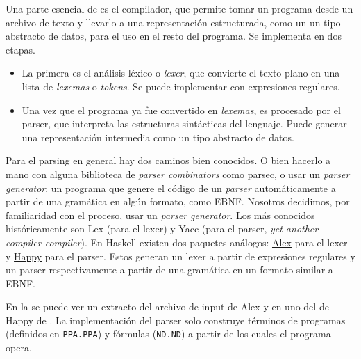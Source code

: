 Una parte esencial de \ppaTool{} es el compilador, que permite tomar un programa
desde un archivo de texto y llevarlo a una representación estructurada, como un
un tipo abstracto de datos, para el uso en el resto del programa. Se implementa
en dos etapas.

\begin{itemize}
    \item La primera es el análisis léxico o \textit{lexer}, que convierte el
    texto plano en una lista de \textit{lexemas} o \textit{tokens}. Se puede
    implementar con expresiones regulares.
    \item Una vez que el programa ya fue convertido en \textit{lexemas}, es
    procesado por el parser, que interpreta las estructuras sintácticas del
    lenguaje. Puede generar una representación intermedia como un tipo abstracto
    de datos.
\end{itemize}

Para el parsing en general hay dos caminos bien conocidos. O bien hacerlo a mano
con alguna biblioteca de \textit{parser combinators} como
\href{https://hackage.haskell.org/package/parsec}{parsec}, o usar un
\textit{parser generator}: un programa que genere el código de un \textit{parser} automáticamente a
partir de una gramática en algún formato, como EBNF. Nosotros decidimos, por
familiaridad con el proceso, usar un \textit{parser generator}. Los más conocidos
históricamente son Lex (para el lexer) y Yacc (para el parser, \textit{yet
another compiler compiler}). En Haskell existen dos paquetes análogos: \href{https://hackage.haskell.org/package/alex}{Alex} para el
lexer y \href{https://hackage.haskell.org/package/happy}{Happy} para el parser.
Estos generan un lexer a partir de expresiones regulares y un parser
respectivamente a partir de una gramática en un formato similar a EBNF.

En la  se puede ver un extracto del archivo de
input de Alex y en  uno del de Happy de
\ppaTool{}. La implementación del parser solo construye términos de programas
(definidos en \texttt{PPA.PPA}) y fórmulas (\texttt{ND.ND}) a partir de los
cuales el programa opera.

